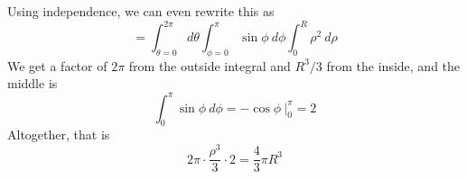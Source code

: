 \documentclass[11pt, oneside]{article}
\begin{document}
Using independence, we can even rewrite this as
\[ = \int_{\theta = 0}^{2 \pi} d \theta \int_{\phi = 0}^{\pi}  \sin \phi \ d \phi \int_0^{R} \rho^2  \ d \rho \]
We get a factor of $2 \pi$ from the outside integral and $R^3/3$ from the inside, and the middle is
\[ \int_{0}^{\pi}  \sin \phi \ d \phi = - \cos \phi \ \bigg |_{0}^{\pi} = 2\]
Altogether, that is
\[ 2 \pi \cdot \frac{\rho^3}{3} \cdot 2 = \frac{4}{3} \pi R^3 \]
\end{document}
